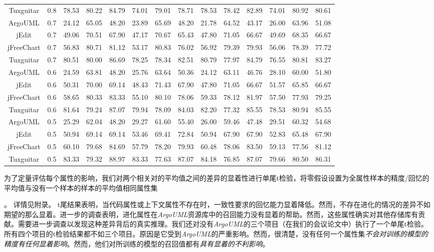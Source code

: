 {\begin{table}[htbp]
\begin{tabular}{cccccccccccccc}
Tuxguitar&0.8&	78.53&	80.22&	84.79&	74.01&	79.01&	78.71&	78.53&	78.42&	82.89&	74.01&	80.92&	80.61\\
ArgoUML&0.7&	24.12&	65.05&	48.20&	23.89&	65.69&	48.20&	21.78&	64.52&	43.17&	26.00&	63.96&	51.08\\
jEdit&0.7&	49.06&	70.51&	67.90&	47.17&	70.67&	65.43&	47.80&	71.05&	66.67&	49.69&	68.35&	66.67\\
jFreeChart&0.7&	56.83&	80.71&	81.12&	53.17&	80.83&	76.02&	56.92&	79.39&	79.93&	56.06&	78.39&	77.72\\
Tuxguitar&0.7&	80.51&	80.00&	86.69&	78.25&	78.34&	82.51&	80.79&	77.97&	84.79&	76.55&	80.81&	83.27\\
ArgoUML&0.6&	24.59&	63.81&	48.20&	25.76&	63.64&	50.36&	24.12&	63.11&	46.76&	28.10&	60.00&	51.80\\
jEdit&0.6&	50.31&	70.00&	69.14&	48.43&	71.43&	67.90&	47.80&	71.05&	66.67&	51.57&	65.85&	66.67\\
jFreeChart&0.6&	58.65&	80.33&	83.33&	55.10&	80.10&	78.06&	59.33&	78.12&	81.97&	57.50&	77.93&	79.25\\
Tuxguitar&0.6&	81.64&	79.24&	87.07&	79.94&	78.09&	84.03&	82.20&	77.32&	85.55&	78.53&	80.94&	85.55\\
ArgoUML&0.5&	25.29&	62.04&	48.20&	29.27&	61.60&	55.40&	26.00&	59.46&	47.48&	29.51&	60.32&	54.68\\
jEdit&0.5&	50.94&	69.14&	69.14&	53.46&	69.41&	72.84&	50.94&	67.90&	67.90&	52.83&	65.48&	67.90\\
jFreeChart&0.5&	60.10&	79.68&	84.69&	57.79&	78.20&	79.93&	60.48&	78.06&	83.50&	59.13&	77.56&	81.12\\
Tuxguitar&0.5&	83.33&	79.32&	88.97&	83.33&	77.63&	87.07&	84.18&	76.85&	87.07&	79.66&	80.50&      86.31\\
\bottomrule[1.5pt]
\end{tabular}
\end{table}

为了定量评估每个属性的影响，我们对两个相关对的平均值之间的差异的显着性进行单尾t检验，将零假设设置为全属性样本的精度/回忆的平均值与没有一个样本的样本的平均值相同属性集}。
详情见附录。 t尾结果表明，当代码属性或上下文属性不存在时，一致性要求的回忆能力显着降低。然而，不存在进化的情况的差异不如期望的那么显着。进一步的调查表明，进化属性在{\em ArgoUML}资源库中的召回能力没有显着的帮助。然而，这些属性确实对其他存储库有贡献。需要进一步调查以发现这种差异背后的真实推理。{我们还对没有{\em  ArgoUML}的三个项目（在我们的会议论文中）执行了一个单尾t检验。所有四个项目的t检验结果都不如三个项目。原因是它受到{\em ArgoUML}的严重影响。}然而，很清楚，没有任何一个属性集{\em 不会对训练的模型的精度有任何显着影响}。然而，他们对所训练的模型的召回值都有{\em 具有显着的不利影响}。 \\

